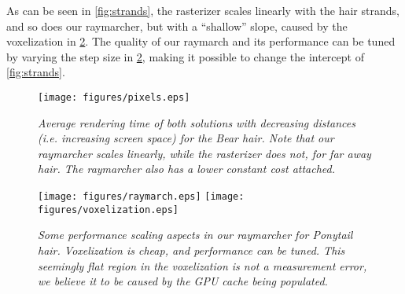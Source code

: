 \documentclass{egpubl}
\begin{document}

As can be seen in \cref{fig:strands}, the rasterizer scales linearly with the hair strands, and so does our raymarcher, but with a ``shallow'' slope, caused by the voxelization in \cref{fig:raymarch}. The quality of our raymarch and its performance can be tuned by varying the step size in \cref{fig:raymarch}, making it possible to change the intercept of \cref{fig:strands}.

\newpage

\begin{figure}[H]
    \vspace{1mm}
    \texttt{[image: figures/pixels.eps]}
    \vspace{-1mm}
    \caption{\emph{Average rendering time of both solutions with decreasing distances (i.e. increasing screen space) for the Bear hair. Note that our raymarcher scales linearly, while the rasterizer does not, for far away hair. The raymarcher also has a lower constant cost attached.}}
    \label{fig:pixels}
    \vspace{-2mm}
\end{figure}

\begin{figure}[H]
    \centering
    \texttt{[image: figures/raymarch.eps]}
    \hfill
    \texttt{[image: figures/voxelization.eps]}
    \vspace{-1mm}
    \caption{\emph{Some performance scaling aspects in our raymarcher for Ponytail hair. Voxelization is cheap, and performance can be tuned. This seemingly flat region in the voxelization is not a measurement error, we believe it to be caused by the GPU cache being populated.}}
    \label{fig:raymarch}
    \vspace{-2mm}
\end{figure}
\end{document}
